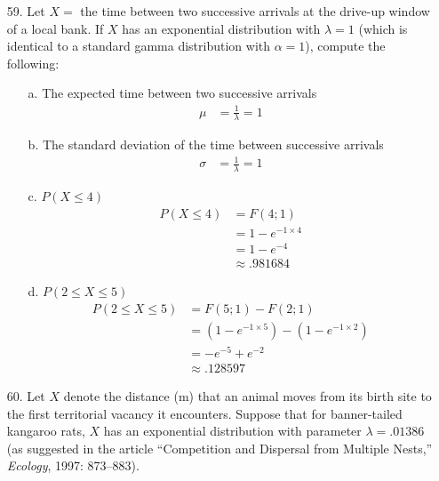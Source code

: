 \documentclass[letterpaper,12pt]{article}
\begin{document}
\maketitle

\begin{enumerate}
  \item[59.]
    Let $X =$ the time between two successive arrivals at the drive-up window of a local bank. If $X$ has an exponential distribution with $\lambda = 1$ (which is identical to a standard gamma distribution with $\alpha = 1$), compute the following:
    \begin{enumerate}
      \item[a.]
        The expected time between two successive arrivals
        \begin{align*}
          \mu &= \frac{1}{\lambda} = 1
        \end{align*}
      \item[b.]
        The standard deviation of the time between successive arrivals
        \begin{align*}
          \sigma &= \frac{1}{\lambda} = 1
        \end{align*}
      \item[c.]
        $P(X \le 4)$
        \begin{align*}
          P(X \le 4) &= F(4; 1) \\
          &= 1 - e^{-1 \times 4} \\
          &= 1 - e^{-4} \\
          &\approx .981684
        \end{align*}
      \item[d.]
        $P(2 \le X \le 5)$
        \begin{align*}
          P(2 \le X \le 5) &= F(5; 1) - F(2; 1) \\
          &= (1 - e^{-1 \times 5}) - (1 - e^{-1 \times 2}) \\
          &= -e^{-5} + e^{-2} \\
          &\approx .128597
        \end{align*}
    \end{enumerate}
  \item[60.]
    Let $X$ denote the distance (m) that an animal moves from its birth site to the first territorial vacancy it encounters. Suppose that for banner-tailed kangaroo rats, $X$ has an exponential distribution with parameter $\lambda = .01386$ (as suggested in the article ``Competition and Dispersal from Multiple Nests,'' \textit{Ecology}, 1997: 873–883).

\end{enumerate}
\end{document}
